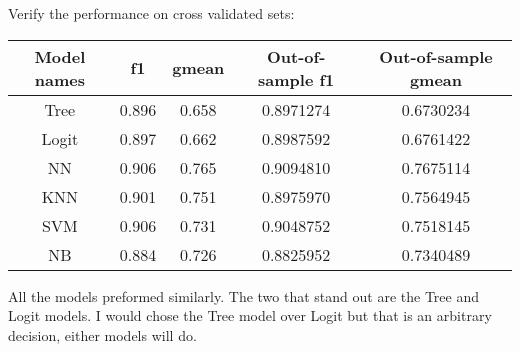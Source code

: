 \documentclass{article}
\begin{document}
Verify the performance on cross validated sets:\\
\begin{center}
 \begin{tabular}{||c c c c c ||} 
 
 \hline
 Model names & f1 & gmean & Out-of-sample f1 & Out-of-sample gmean\\ [0.5ex] 
 
 \hline\hline
 Tree & 0.896 & 0.658 & 0.8971274 & 0.6730234  \\ 
 \hline
 Logit & 0.897 & 0.662 &  0.8987592 &  0.6761422\\
 \hline
 NN & 0.906 & 0.765 & 0.9094810 & 0.7675114 \\
 \hline
 KNN & 0.901 & 0.751 & 0.8975970  & 0.7564945 \\
 \hline
 SVM & 0.906 & 0.731 & 0.9048752 & 0.7518145 \\
 \hline
 NB & 0.884 & 0.726 & 0.8825952 & 0.7340489\\[1ex] 
 
 
 \hline
\end{tabular}
\end{center}


All the models preformed similarly. The two that stand out are the Tree and Logit models. I would chose the Tree model over Logit but that is an arbitrary decision, either models will do.  
\end{document}
